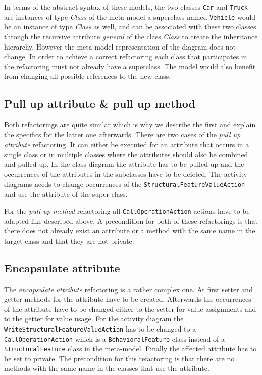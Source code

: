 \documentclass{llncs}
\begin{document}
In terms of the abstract syntax of these models, the two classes \lstinline|Car| and \lstinline|Truck| are instances of 
type \textit{Class} of the meta-model a superclass named \lstinline|Vehicle| would be an instance of type \textit{Class} as well, 
and can be associated with these two classes through the recursive attribute \textit{general} of the class \textit{Class} 
to create the inheritance hierarchy. However the meta-model representation of the diagram does not change. In order to 
achieve a correct refactoring each class that participates in the refactoring must not already have a superclass. The 
model would also benefit from changing all possible references to the new class.

\subsection{Pull up attribute \& pull up method}
\label{sec:pullup}
Both refactorings are quite similar which is why we describe the first and explain the specifics for the latter one afterwards. 
There are two cases of the \textit{pull up attribute} refactoring. It can either be executed for an attribute that occurs in 
a single class or in multiple classes where the attributes should also be combined and pulled up. In the class diagram 
the attribute has to be pulled up and the occurrences of the attributes in the subclasses have to be deleted. The 
activity diagrams needs to change occurrences of the \lstinline|StructuralFeatureValueAction| and use the attribute of 
the super class.

For the \textit{pull up method} refactoring all \lstinline|CallOperationAction| actions have to be adapted like described 
above. A precondition for both of these refactorings is that there does not already exist an attribute or a method with the same name 
in the target class and that they are not private.

\subsection{Encapsulate attribute}
\label{sec:encapsulate}
The \textit{encapsulate attribute} refactoring is a rather complex one. At first setter and getter methods for the attribute have to be 
created. Afterwards the occurrences of the attribute have to be changed either to the setter for value assignments and to the getter 
for value usage. For the activity diagram the \lstinline|WriteStructuralFeatureValueAction| has to be changed to a 
\lstinline|CallOperationAction| which is a \lstinline|BehavioralFeature| class instead of a \lstinline|StructuralFeature| class in 
the meta-model. Finally the affected attribute has to be set to private. The precondition for this refactoring is that there are no 
methods with the same name in the classes that use the attribute.
\end{document}
